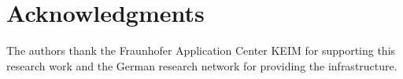 \section*{Acknowledgments}
The authors thank the Fraunhofer Application Center KEIM for supporting this research work and the German research network for providing the infrastructure.
